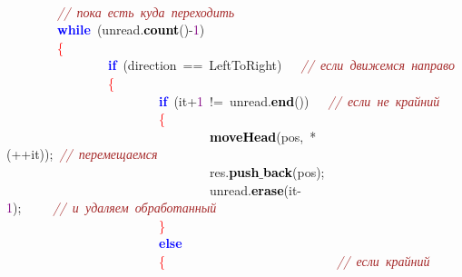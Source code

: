 \mbox{} \\
\mbox{}\ \ \ \ \ \ \ \ \textit{\textcolor{Brown}{//\ пока\ есть\ куда\ переходить}} \\
\mbox{}\ \ \ \ \ \ \ \ \textbf{\textcolor{Blue}{while}}\ \textcolor{BrickRed}{(}unread\textcolor{BrickRed}{.}\textbf{\textcolor{Black}{count}}\textcolor{BrickRed}{()-}\textcolor{Purple}{1}\textcolor{BrickRed}{)} \\
\mbox{}\ \ \ \ \ \ \ \ \textcolor{Red}{\{} \\
\mbox{}\ \ \ \ \ \ \ \ \ \ \ \ \ \ \ \ \textbf{\textcolor{Blue}{if}}\ \textcolor{BrickRed}{(}direction\ \textcolor{BrickRed}{==}\ LeftToRight\textcolor{BrickRed}{)}\ \ \ \textit{\textcolor{Brown}{//\ если\ движемся\ направо}} \\
\mbox{}\ \ \ \ \ \ \ \ \ \ \ \ \ \ \ \ \textcolor{Red}{\{} \\
\mbox{}\ \ \ \ \ \ \ \ \ \ \ \ \ \ \ \ \ \ \ \ \ \ \ \ \textbf{\textcolor{Blue}{if}}\ \textcolor{BrickRed}{(}it\textcolor{BrickRed}{+}\textcolor{Purple}{1}\ \textcolor{BrickRed}{!=}\ unread\textcolor{BrickRed}{.}\textbf{\textcolor{Black}{end}}\textcolor{BrickRed}{())}\ \ \ \textit{\textcolor{Brown}{//\ если\ не\ крайний}} \\
\mbox{}\ \ \ \ \ \ \ \ \ \ \ \ \ \ \ \ \ \ \ \ \ \ \ \ \textcolor{Red}{\{} \\
\mbox{}\ \ \ \ \ \ \ \ \ \ \ \ \ \ \ \ \ \ \ \ \ \ \ \ \ \ \ \ \ \ \ \ \textbf{\textcolor{Black}{moveHead}}\textcolor{BrickRed}{(}pos\textcolor{BrickRed}{,}\ \textcolor{BrickRed}{*(++}it\textcolor{BrickRed}{));}\ \textit{\textcolor{Brown}{//\ перемещаемся}} \\
\mbox{}\ \ \ \ \ \ \ \ \ \ \ \ \ \ \ \ \ \ \ \ \ \ \ \ \ \ \ \ \ \ \ \ res\textcolor{BrickRed}{.}\textbf{\textcolor{Black}{push$\_$back}}\textcolor{BrickRed}{(}pos\textcolor{BrickRed}{);} \\
\mbox{}\ \ \ \ \ \ \ \ \ \ \ \ \ \ \ \ \ \ \ \ \ \ \ \ \ \ \ \ \ \ \ \ unread\textcolor{BrickRed}{.}\textbf{\textcolor{Black}{erase}}\textcolor{BrickRed}{(}it\textcolor{BrickRed}{-}\textcolor{Purple}{1}\textcolor{BrickRed}{);}\ \ \ \ \ \textit{\textcolor{Brown}{//\ и\ удаляем\ обработанный}} \\
\mbox{}\ \ \ \ \ \ \ \ \ \ \ \ \ \ \ \ \ \ \ \ \ \ \ \ \textcolor{Red}{\}} \\
\mbox{}\ \ \ \ \ \ \ \ \ \ \ \ \ \ \ \ \ \ \ \ \ \ \ \ \textbf{\textcolor{Blue}{else}} \\
\mbox{}\ \ \ \ \ \ \ \ \ \ \ \ \ \ \ \ \ \ \ \ \ \ \ \ \textcolor{Red}{\{}\ \ \ \ \ \ \ \ \ \ \ \ \ \ \ \ \ \ \ \ \ \ \ \ \ \ \ \textit{\textcolor{Brown}{//\ если\ крайний}} \\
